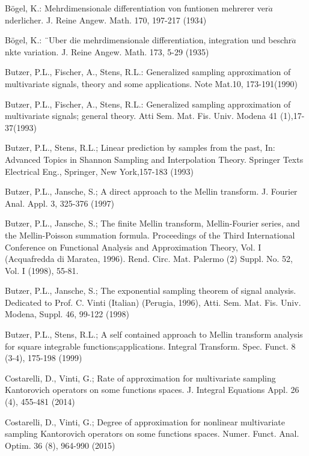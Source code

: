 \documentclass[12pt]{article}
\begin{document}
{\begin{thebibliography}{99}
  B\"{o}gel, K.: Mehrdimensionale differentiation von funtionen mehrerer ver$\ddot{a}$nderlicher. J. Reine Angew. Math. 170, 197-217 (1934)

   B\"{o}gel, K.: ¨Uber die mehrdimensionale differentiation, integration und beschr$\ddot{a}$nkte variation. J. Reine Angew. Math. 173, 5-29 (1935)

 Butzer, P.L., Fischer, A., Stens, R.L.: Generalized sampling approximation of multivariate signals, theory and some applications.  Note Mat.10, 173-191(1990)

 Butzer, P.L., Fischer, A., Stens, R.L.: Generalized sampling approximation of multivariate signals; general theory.  Atti Sem. Mat. Fis. Univ. Modena 41 (1),17-37(1993)


 Butzer, P.L., Stens, R.L.; Linear prediction by samples from the past, In: Advanced Topics in Shannon Sampling and Interpolation Theory. Springer Texts Electrical Eng., Springer, New York,157-183 (1993)


 Butzer, P.L., Jansche, S.; A direct approach to the Mellin transform. J. Fourier Anal. Appl. 3, 325-376 (1997)

 Butzer, P.L., Jansche, S.; The finite Mellin transform, Mellin-Fourier series, and the Mellin-Poisson summation formula. Proceedings of the Third International Conference on Functional Analysis and Approximation Theory, Vol. I (Acquafredda di Maratea, 1996). Rend. Circ. Mat. Palermo (2) Suppl. No. 52, Vol. I (1998), 55-81.

 Butzer, P.L., Jansche, S.; The exponential sampling theorem of signal analysis. Dedicated to Prof. C. Vinti (Italian) (Perugia, 1996), Atti. Sem. Mat. Fis. Univ. Modena, Suppl. 46, 99-122 (1998)

 Butzer, P.L., Stens, R.L.; A self contained approach to Mellin transform analysis for square integrable functions;applications. Integral Transform. Spec. Funct. 8 (3-4), 175-198 (1999)


 Costarelli, D., Vinti, G.; Rate of approximation for multivariate sampling Kantorovich operators on some functions spaces. J. Integral Equations Appl. 26 (4), 455-481 (2014)

 Costarelli, D., Vinti, G.; Degree of approximation for nonlinear multivariate sampling Kantorovich operators on some functions spaces. Numer. Funct. Anal. Optim. 36 (8), 964-990 (2015)



\end{thebibliography}}
\end{document}

